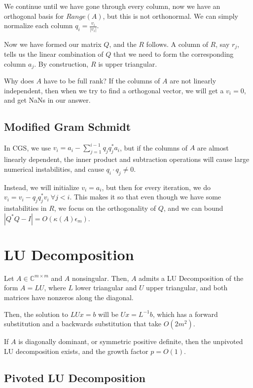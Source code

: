\documentclass{article}
\theoremstyle{definition}
\begin{document}
We continue until we have gone through every column, now we have an orthogonal basis for $Range(A)$, but this is not orthonormal. We can simply normalize each column $q_i = \frac{v_i}{|v_i|}$.

Now we have formed our matrix $Q$, and the $R$ follows. A column of $R$, say $r_j$, tells us the linear combination of $Q$ that we need to form the corresponding column $a_j$. By construction, $R$ is upper triangular.

Why does $A$ have to be full rank? If the columns of $A$ are not linearly independent, then when we try to find a orthogonal vector, we will get a $v_i = 0$, and get NaNs in our answer.

\subsection{Modified Gram Schmidt}

In CGS, we use $v_i = a_i - \sum_{j=1}^{i-1} q_j q_j^* a_i$, but if the columns of $A$ are almost linearly dependent, the inner product and subtraction operations will cause large numerical instabilities, and cause $q_i \cdot q_j \neq 0$.

Instead, we will initialize $v_i = a_i$, but then for every iteration, we do $v_i = v_i - q_j q_j^* v_i\ \forall j < i$. This makes it so that even though we have some instabilities in $R$, we focus on the orthogonality of $Q$, and we can bound $|Q^* Q - I| = O(\kappa(A) \epsilon_m)$.

\pagebreak

\section{LU Decomposition}

Let $A \in \mathbb{C}^{m \times m}$ and $A$ nonsingular. Then, $A$ admits a LU Decomposition of the form $A = LU$, where $L$ lower triangular and $U$ upper triangular, and both matrices have nonzeros along the diagonal.

Then, the solution to $LUx = b$ will be $Ux = L^{-1} b$, which has a forward substitution and a backwards substitution that take $O(2m^2)$.

If $A$ is diagonally dominant, or symmetric positive definite, then the unpivoted LU decomposition exists, and the growth factor $p = O(1)$.

\subsection{Pivoted LU Decomposition}
\end{document}
